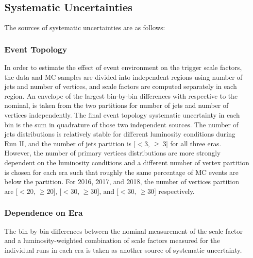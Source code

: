 {\subsection{Systematic Uncertainties}
The sources of systematic uncertainties are as follows:
\subsubsection{Event Topology}
In order to estimate the effect of event environment on the trigger scale factors, the data and MC samples are divided into independent regions using number of jets and number of vertices, and scale factors are computed separately in each region. 
An envelope of the largest bin-by-bin differences with respective to the nominal, is taken from the two partitions for number of jets and number of vertices independently.
The final event topology systematic uncertainty in each bin is the sum in quadrature of those two independent sources.
The number of jets distributions is relatively stable for different luminosity conditions during Run II, and the number of jets partition is [$< 3$, $\geq\ 3$] for all three eras.
However, the number of primary vertices distributions are more strongly dependent on the luminosity conditions and a different number of vertex partition is chosen for each era such that roughly the same percentage of MC events are below the partition.
For 2016, 2017, and 2018, the number of vertices partition are [$< 20$, $\geq 20$], [$< 30$, $\geq 30$], and [$< 30$, $\geq 30$] respectively.
\subsubsection{Dependence on Era}
The bin-by bin differences between the nominal measurement of the scale factor and a luminosity-weighted combination of scale factors measured for the individual runs in each era is taken as another source of systematic uncertainty.
}
